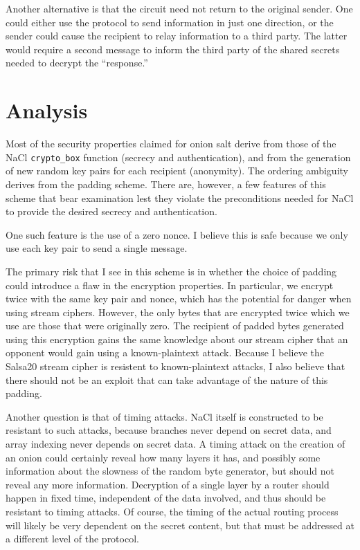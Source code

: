 \documentclass[letterpaper,twocolumn,amsmath,amssymb,pre,aps,10pt]{revtex4-1}
\begin{document}
Another alternative is that the circuit need not return to the
original sender.  One could either use the protocol to send
information in just one direction, or the sender could cause the
recipient to relay information to a third party.  The latter would
require a second message to inform the third party of the shared
secrets needed to decrypt the ``response.''

\section{Analysis}

Most of the security properties claimed for onion salt derive from
those of the NaCl \texttt{crypto\_box} function (secrecy and
authentication), and from the generation of new random key pairs for
each recipient (anonymity).  The ordering ambiguity derives from the
padding scheme.  There are, however, a few features of this scheme
that bear examination lest they violate the preconditions needed for
NaCl to provide the desired secrecy and authentication.

One such feature is the use of a zero nonce.  I believe this is safe
because we only use each key pair to send a single message.

The primary risk that I see in this scheme is in whether the choice of
padding could introduce a flaw in the encryption properties.  In
particular, we encrypt twice with the same key pair and nonce, which
has the potential for danger when using stream ciphers.  However, the
only bytes that are encrypted twice which we use are those that were
originally zero.  The recipient of padded bytes generated using this
encryption gains the same knowledge about our stream cipher that an
opponent would gain using a known-plaintext attack.  Because I believe
the Salsa20 stream cipher is resistent to known-plaintext attacks, I
also believe that there should not be an exploit that can take
advantage of the nature of this padding.

Another question is that of timing attacks.  NaCl itself is
constructed to be resistant to such attacks, because branches never
depend on secret data, and array indexing never depends on secret
data.  A timing attack on the creation of an onion could certainly
reveal how many layers it has, and possibly some information about the
slowness of the random byte generator, but should not reveal any more
information.  Decryption of a single layer by a router should happen
in fixed time, independent of the data involved, and thus should be
resistant to timing attacks.  Of course, the timing of the actual
routing process will likely be very dependent on the secret content,
but that must be addressed at a different level of the protocol.
\end{document}
